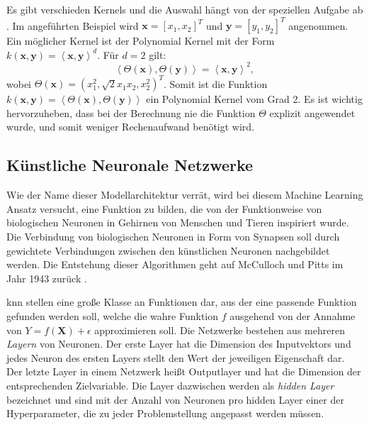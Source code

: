 Es gibt verschieden Kernels und die Auswahl h\"angt von der speziellen Aufgabe ab \cite{SVM1}. Im angef\"uhrten Beispiel wird $ \mathbf{x} = [x_1, x_2]^T$ und $\mathbf{y} = [y_1, y_2]^T$ angenommen.
Ein m\"oglicher Kernel ist der Polynomial Kernel mit der Form
$k(\mathbf{x}, \mathbf{y}) = \left\langle \mathbf{x}, \mathbf{y} \right\rangle^d$. F\"ur $d=2$ gilt:
$$ \left\langle \Theta(\mathbf{x}), \Theta(\mathbf{y}) \right\rangle = \left\langle \mathbf{x}, \mathbf{y} \right\rangle^2, $$
wobei $\Theta(\mathbf{x}) = (x_1^2, \sqrt{2}x_1x_2, x_2^2)^T$.
Somit ist die Funktion $k(\mathbf{x}, \mathbf{y}) = \left\langle \Theta(\mathbf{x}), \Theta(\mathbf{y}) \right\rangle$
ein Polynomial Kernel vom Grad 2. Es ist wichtig hervorzuheben, dass bei der Berechnung nie die Funktion $\Theta$ explizit angewendet wurde,
und somit weniger Rechenaufwand ben\"otigt wird.































\subsection{K\"unstliche Neuronale Netzwerke}
Wie der Name dieser Modellarchitektur verr\"at, wird bei diesem Machine Learning Ansatz versucht, eine Funktion zu bilden, die von der Funktionweise
von biologischen Neuronen in Gehirnen von Menschen und Tieren inspiriert wurde. Die Verbindung von biologischen Neuronen in Form von Synapsen soll durch gewichtete
Verbindungen zwischen den k\"unstlichen Neuronen nachgebildet werden. Die Entstehung dieser Algorithmen
geht auf McCulloch und Pitts im Jahr 1943 zur\"uck \cite{McCulloch}.

\gls{knn} stellen eine gro{\ss}e Klasse an Funktionen dar, aus der eine passende Funktion gefunden werden soll, welche
die wahre Funktion $f$ ausgehend von der Annahme von $Y = f(\mathbf{X}) + \epsilon$ approximieren soll. Die Netzwerke bestehen aus mehreren \textit{Layern} von Neuronen. Der erste Layer hat
die Dimension des Inputvektors und jedes Neuron des ersten Layers stellt den Wert der jeweiligen Eigenschaft dar. Der letzte Layer in einem Netzwerk hei{\ss}t
Outputlayer und hat die Dimension der entsprechenden Zielvariable. Die Layer dazwischen werden als \textit{hidden Layer} bezeichnet und sind mit der Anzahl von Neuronen pro
hidden Layer einer der Hyperparameter, die zu jeder Problemstellung angepasst werden m\"ussen.

